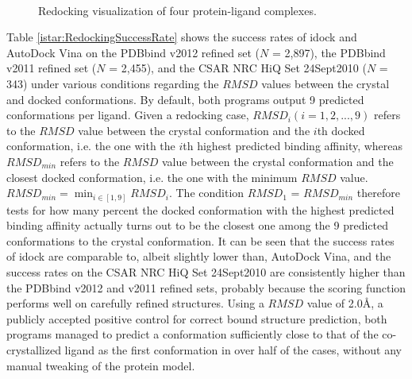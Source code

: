 \begin{figure}
\centering
{}
\\
\caption{Redocking visualization of four protein-ligand complexes.}
\label{istar:RedockingVisualization}
\end{figure}

Table \ref{istar:RedockingSuccessRate} shows the success rates of idock and AutoDock Vina on the PDBbind v2012 refined set ($N$ = 2,897), the PDBbind v2011 refined set ($N$ = 2,455), and the CSAR NRC HiQ Set 24Sept2010 ($N$ = 343) under various conditions regarding the $RMSD$ values between the crystal and docked conformations. By default, both programs output 9 predicted conformations per ligand. Given a redocking case, $RMSD_i (i = 1,2,...,9)$ refers to the $RMSD$ value between the crystal conformation and the $i$th docked conformation, i.e. the one with the $i$th highest predicted binding affinity, whereas $RMSD_{min}$ refers to the $RMSD$ value between the crystal conformation and the closest docked conformation, i.e. the one with the minimum $RMSD$ value. $RMSD_{min} = \displaystyle\min_{i\in[1, 9]}RMSD_i$. The condition $RMSD_1$ = $RMSD_{min}$ therefore tests for how many percent the docked conformation with the highest predicted binding affinity actually turns out to be the closest one among the 9 predicted conformations to the crystal conformation. It can be seen that the success rates of idock are comparable to, albeit slightly lower than, AutoDock Vina, and the success rates on the CSAR NRC HiQ Set 24Sept2010 are consistently higher than the PDBbind v2012 and v2011 refined sets, probably because the scoring function performs well on carefully refined structures. Using a $RMSD$ value of 2.0\AA, a publicly accepted positive control for correct bound structure prediction, both programs managed to predict a conformation sufficiently close to that of the co-crystallized ligand as the first conformation in over half of the cases, without any manual tweaking of the protein model.

